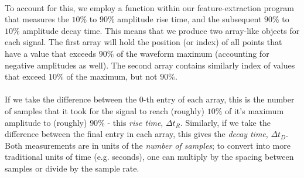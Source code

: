 \documentclass[12pt,letterpaper]{article}
\begin{document}
\paragraph*{}To account for this, we employ a function within our feature-extraction program that measures the $10\%$ to $90\%$ amplitude rise time, and the subsequent $90\%$ to $10\%$ amplitude decay time. This means that we produce two array-like objects for each signal. The first array will hold the position (or index) of all points that have a value that exceeds $90\%$ of the waveform maximum (accounting for negative amplitudes as well). The second array contains similarly index of values that exceed $10\%$ of the maximum, but not $90\%$.

\paragraph*{}If we take the difference between the $0$-th entry of each array, this is the number of samples that it took for the signal to reach (roughly) $10\%$ of it's maximum amplitude to (roughly) $90\%$ - this \textit{rise time}, $\Delta t_{R}$. Similarly, if we take the difference between the final entry in each array, this gives the \textit{decay time}, $\Delta t_{D}$. Both measurements are in units of the \textit{number of samples}; to convert into more traditional units of time (e.g. seconds), one can multiply by the spacing between samples or divide by the sample rate.
\end{document}

